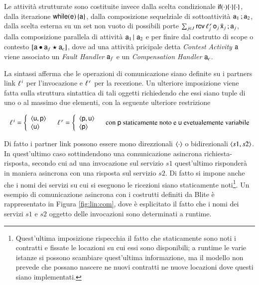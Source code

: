 Le attività strutturate sono costituite invece dalla scelta condizionale
${\sf if}(\cdot)\{ \cdot \}\{\cdot\}$, dalla iterazione ${\sf while}({\sf e})\, \{ {\sf a}\}$, dalla
composizione sequelziale di sottoattività ${\sf a}_1\, ;{\sf a}_2$, dalla scelta
esterna su un set non vuoto di possibili porte $\sum_{j \in
J}{\sf rcv}\,\ell^{\,r}_j\, {\sf o}_j\, \bar{{\sf x}}_j\, ;{\sf a}_j$, dalla composizione parallela
di attività ${\sf a}_1\,|\,\, {\sf a}_2$ e per finire dal costrutto di scope o contesto
$[{\sf a} \bullet {\sf a}_f \star {\sf a}_c]$, dove ad una attività pricipale
detta \emph{Contest Activity} ${\sf a}$ viene associato un \emph{Fault Handler}
${\sf a}_f$ e un \emph{Compensation Handler} ${\sf a}_c$.

La sintassi afferma che le operazioni di comunicazione siano
definite su i partners link $\ell^{\,i}$ per l'invocazione e $\ell^{\,r}$ per la
recezione. Un ulteriore imposizione viene fatta sulla struttura sintattica di
tali oggetti richiedendo che essi siano tuple di uno o al massimo due elementi,
con la seguente ulteriore restrizione

$$
\begin{array}{ccc}

\plinv = \left\{ 
\begin{array}{l}
 \arr{\xu,\xp}   \\
 \arr{\xu}  
\end{array} \right.

&

\plrec = \left\{ 
\begin{array}{l}
 \arr{\xp,\xu}   \\
 \arr{\xp}  
\end{array} \right.

& \textrm{con } \xp \textrm{ staticamente noto e } \xu \textrm{
evetualemente variabile}

\end{array}
$$

Di fatto i partner link possono essere mono direzzionali $\langle \cdot \rangle$ o
bidirezionali $\langle s1, s2 \rangle$. In quest'ultimo caso sottindendono una
comunicazione asincrona richiesta-risposta, secondo cui ad una invocazione sul servizio $s1$
quest'ultimo risponderà in maniera asincrona con una risposta sul servizio $s2$.
Di fatto si impone anche che i nomi dei servizi su cui si eseguono le ricezioni
siano staticamente noti\footnote{Quest'ultima imposizione rispecchia il
fatto che staticamente sono noti i contratti e fissate le
locazioni su cui essi sono disponibili; a runtime le varie istanze si possono
scambiare quest'ultima informazione, ma il modello non prevede che possano
nascere ne nuovi contratti ne nuove locazioni dove questi siano implementati.}.
Un esempio di comunicazione asincrona con i costrutti definiti da Blite è
rappresentato in Figura \ref{fig:lin:com}, dove è esplicitato il fatto che i
nomi dei servizi $s1$ e $s2$ oggetto delle invocazioni sono determinati a
runtime.

